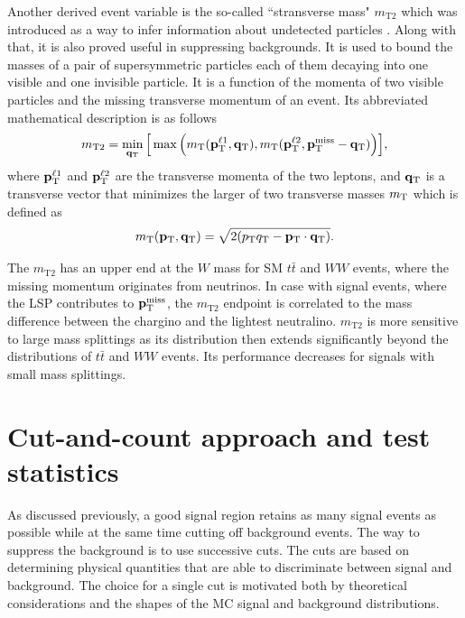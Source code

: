Another derived event variable is the so-called ``stransverse mass"  $m_{\text {T2}}$ which was introduced as a way to infer information about undetected particles \citep{Lester:1999tx,Barr:2003rg}. Along with that, it is also proved useful in suppressing backgrounds. It is used to bound the masses of a pair of supersymmetric particles each of them decaying into one visible and one invisible particle. It is a function of the momenta of two visible particles and the missing transverse momentum of an event. Its abbreviated mathematical description is as follows
\begin{equation}
m_{\text{T2}} = \min_{\mathbf{q}_{\text T}}\Big [\max \Big ( m_{\text T} (\mathbf{p}_{\text T}^{\ell 1},\mathbf{q}_{\text T}),m_{\text T}(\mathbf{p}_{\text T}^{\ell 2},\mathbf{p}_{\text T}^{\text{miss}}-\mathbf{q}_{\text T}) \Big ) \Big ] ,
\end{equation}
where $\mathbf{p}_{\text T}^{\ell 1}$ and $\mathbf{p}_{\text T}^{\ell 2}$ are the transverse momenta of the two leptons, and $ \mathbf{q}_{\text T}$ is a transverse vector that minimizes the larger of two transverse masses $m_{\text T}$ which is defined as
\begin{equation}
m_{\text T}(\mathbf{p}_{\text T},\mathbf{q}_{\text T}) = \sqrt{2(p_{\text T}q_{\text T} - \mathbf{p}_{\text T} \cdot \mathbf{q}_{\text T})}.
\end{equation}

The $m_{\text{T2}}$ has an upper end at the $W$ mass for SM $t\bar{t}$ and $WW$ events, where the missing momentum originates from neutrinos. In case with signal events, where the LSP contributes to $ \mathbf{p}_{\text T}^{\text{miss}}$, the $m_{\text{T2}}$ endpoint is correlated to the mass difference between the chargino and the lightest neutralino. $m_{\text{T2}}$ is more sensitive to large mass splittings as its distribution then extends significantly beyond the distributions of $t\bar{t}$ and $WW$ events. Its performance decreases for signals with small mass splittings.  

\section{Cut-and-count approach and test statistics}
\label{subsec:stat}
As discussed previously, a good signal region retains as many signal events as possible while at the same time cutting off background events. The way to suppress the background is to use successive cuts. The cuts are based on determining physical quantities that are able to discriminate between signal and background. The choice for a single cut is motivated both by theoretical considerations and the shapes of the MC signal and background distributions. 


